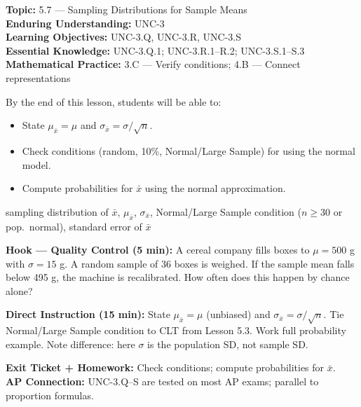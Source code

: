 \documentclass[10pt]{article}
\begin{document}

\begin{objectivebox}
\textbf{Topic:} 5.7 — Sampling Distributions for Sample Means\\
\textbf{Enduring Understanding:} UNC-3\\
\textbf{Learning Objectives:} UNC-3.Q, UNC-3.R, UNC-3.S\\
\textbf{Essential Knowledge:} UNC-3.Q.1; UNC-3.R.1--R.2; UNC-3.S.1--S.3\\
\textbf{Mathematical Practice:} 3.C — Verify conditions; 4.B — Connect representations
\end{objectivebox}

\begin{learningtargetbox}
By the end of this lesson, students will be able to:
\begin{itemize}
  \item State $\mu_{\bar{x}} = \mu$ and $\sigma_{\bar{x}} = \sigma/\sqrt{n}$.
  \item Check conditions (random, 10\%, Normal/Large Sample) for using the normal model.
  \item Compute probabilities for $\bar{x}$ using the normal approximation.
\end{itemize}
\end{learningtargetbox}

\begin{vocabbox}
sampling distribution of $\bar{x}$, $\mu_{\bar{x}}$, $\sigma_{\bar{x}}$, Normal/Large Sample condition ($n \ge 30$ or pop.\ normal), standard error of $\bar{x}$
\end{vocabbox}

\begin{hookbox}
\textbf{Hook — Quality Control (5 min):} A cereal company fills boxes to $\mu = 500$ g with $\sigma = 15$ g. A random sample of 36 boxes is weighed. If the sample mean falls below 495 g, the machine is recalibrated. How often does this happen by chance alone?
\end{hookbox}

\begin{notesbox}
\textbf{Direct Instruction (15 min):} State $\mu_{\bar{x}} = \mu$ (unbiased) and $\sigma_{\bar{x}} = \sigma/\sqrt{n}$. Tie Normal/Large Sample condition to CLT from Lesson 5.3. Work full probability example. Note difference: here $\sigma$ is the population SD, not sample SD.
\end{notesbox}

\begin{reflectionbox}
\textbf{Exit Ticket + Homework:} Check conditions; compute probabilities for $\bar{x}$.\\
\textbf{AP Connection:} UNC-3.Q--S are tested on most AP exams; parallel to proportion formulas.
\end{reflectionbox}
\end{document}
